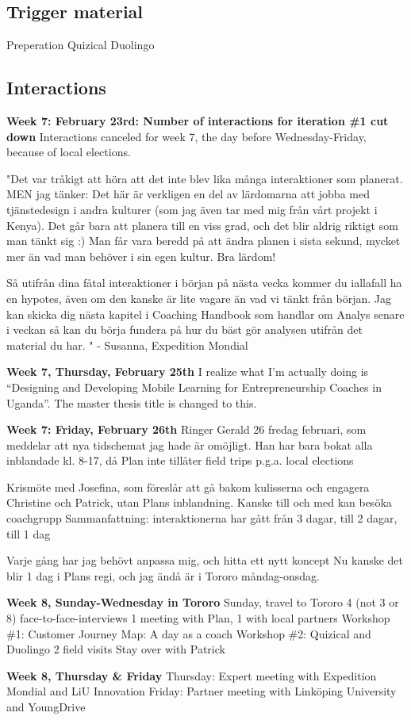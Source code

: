 \subsection*{Trigger material}
Preperation
Quizical
Duolingo

\subsection*{Interactions}
\textbf{Week 7: February 23rd: Number of interactions for iteration \#1 cut down}
Interactions canceled for week 7, the day before Wednesday-Friday, because of local elections.

"Det var tråkigt att höra att det inte blev lika många interaktioner som planerat.
MEN jag tänker: Det här är verkligen en del av lärdomarna att jobba med tjänstedesign i andra kulturer (som jag även tar med mig från vårt projekt i Kenya). Det går bara att planera till en viss grad, och det blir aldrig riktigt som man tänkt sig :) Man får vara beredd på att ändra planen i sista sekund, mycket mer än vad man behöver i sin egen kultur. Bra lärdom!

Så utifrån dina fåtal interaktioner i början på nästa vecka kommer du iallafall ha en hypotes, även om den kanske är lite vagare än vad vi tänkt från början. Jag kan skicka dig nästa kapitel i Coaching Handbook som handlar om Analys senare i veckan så kan du börja fundera på hur du bäst gör analysen utifrån det material du har. " - Susanna, Expedition Mondial

\textbf{Week 7, Thursday, February 25th}
I realize what I’m actually doing is “Designing and Developing Mobile Learning for Entrepreneurship Coaches in Uganda”. The master thesis title is changed to this.

\textbf{Week 7: Friday, February 26th}
Ringer Gerald 26 fredag februari, som meddelar att nya tidschemat jag hade är omöjligt. Han har bara bokat alla inblandade kl. 8-17, då Plan inte tillåter field trips p.g.a. local elections

Krismöte med Josefina, som föreslår att gå bakom kulisserna och engagera Christine och Patrick, utan Plans inblandning. Kanske till och med kan besöka coachgrupp
Sammanfattning: interaktionerna har gått från 3 dagar, till 2 dagar, till 1 dag

Varje gång har jag behövt anpassa mig, och hitta ett nytt koncept
Nu kanske det blir 1 dag i Plans regi, och jag ändå är i Tororo måndag-onsdag.

\textbf{Week 8, Sunday-Wednesday in Tororo}
Sunday, travel to Tororo
4 (not 3 or 8) face-to-face-interviews
1 meeting with Plan, 1 with local partners
Workshop \#1: Customer Journey Map: A day as a coach
Workshop \#2: Quizical and Duolingo
2 field visits
Stay over with Patrick

\textbf{Week 8, Thursday \& Friday}
Thursday: Expert meeting with Expedition Mondial and LiU Innovation
Friday: Partner meeting with Linköping University and YoungDrive

